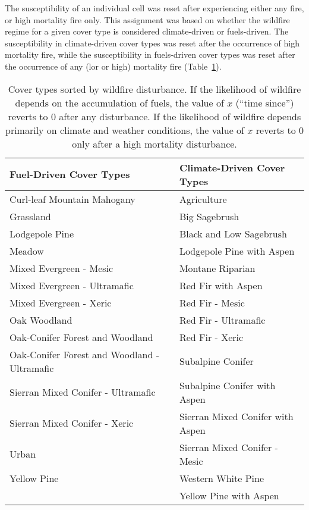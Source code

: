 \begin{itemize}
The susceptibility of an individual cell was reset after experiencing either any fire, or high mortality fire only. This assignment was based on whether the wildfire regime for a given cover type is considered climate-driven or fuels-driven. The susceptibility in climate-driven cover types was reset after the occurrence of high mortality fire, while the susceptibility in fuels-driven cover types was reset after the occurrence of any (lor or high) mortality fire (Table~\ref{howdriven}).

\begin{table}[htbp]
\footnotesize
\centering
\caption{Cover types sorted by wildfire disturbance. If the likelihood of wildfire depends on the accumulation of fuels, the value of $x$ (``time since'') reverts to 0 after any disturbance. If the likelihood of wildfire depends primarily on climate and weather conditions, the value of $x$ reverts to 0 only after a high mortality disturbance.}
\label{howdriven}
\begin{tabular}{ll}
\hline
 \textbf{Fuel-Driven Cover Types} 	& \textbf{Climate-Driven Cover Types}	\\
\hline
Curl-leaf Mountain Mahogany 	        & Agriculture   			\\
Grassland     			        & Big Sagebrush 			\\
Lodgepole Pine                          & Black and Low Sagebrush		\\
Meadow				        & Lodgepole Pine with Aspen 		\\
Mixed Evergreen - Mesic			& Montane Riparian			\\
Mixed Evergreen - Ultramafic            & Red Fir with Aspen   			\\
Mixed Evergreen - Xeric 		& Red Fir - Mesic    			\\
Oak Woodland 				& Red Fir - Ultramafic 			\\
Oak-Conifer Forest and Woodland 	& Red Fir - Xeric 			\\
Oak-Conifer Forest and Woodland - Ultramafic 	& Subalpine Conifer 		\\
Sierran Mixed Conifer - Ultramafic 	& Subalpine Conifer with Aspen 		\\
Sierran Mixed Conifer - Xeric 		& Sierran Mixed Conifer with Aspen 	\\
Urban 					& Sierran Mixed Conifer - Mesic 	\\
Yellow Pine 				& Western White Pine 			\\
					& Yellow Pine with Aspen 		\\
\hline
\end{tabular}
\end{table}



\end{itemize}
